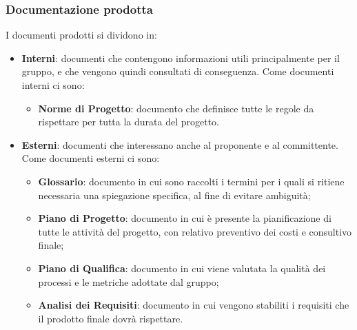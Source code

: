 \subsubsection{Documentazione prodotta}
I documenti prodotti si dividono in:
\begin{itemize}
    \item \textbf{Interni}: documenti che contengono informazioni utili principalmente 
    per il gruppo, e che vengono quindi consultati di conseguenza. 
    Come documenti interni ci sono:
    \begin{itemize}
        \item \textbf{Norme di Progetto}: documento che definisce tutte le regole da rispettare per tutta la durata del progetto.
    \end{itemize}
    \item \textbf{Esterni}: documenti che interessano anche al proponente e al committente. Come documenti esterni ci sono:
    \begin{itemize}
        \item \textbf{Glossario}: documento in cui sono raccolti i termini per i quali si ritiene necessaria una spiegazione specifica, al fine di evitare ambiguità;
        \item \textbf{Piano di Progetto}: documento in cui è presente la pianificazione di tutte le attività del progetto, con relativo preventivo dei costi e consultivo finale;
        \item \textbf{Piano di Qualifica}: documento in cui viene valutata la qualità dei processi e le metriche adottate dal gruppo;
        \item \textbf{Analisi dei Requisiti}: documento in cui vengono stabiliti i requisiti che il prodotto finale dovrà rispettare.
    \end{itemize}
\end{itemize}